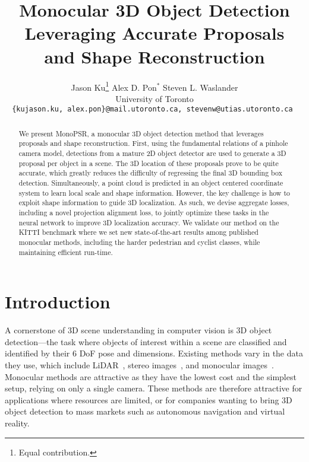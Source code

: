 \documentclass[10pt,twocolumn,letterpaper]{article}
\begin{document}
	
\title{Monocular 3D Object Detection Leveraging Accurate Proposals \\ and Shape Reconstruction}
	
	\author{Jason Ku\thanks{Equal contribution.} \quad Alex D. Pon$^\ast$ \quad Steven L. Waslander \\
	University of Toronto \\
	\tt\small\{kujason.ku, alex.pon\}@mail.utoronto.ca, stevenw@utias.utoronto.ca
	}
	
	\maketitle


\begin{abstract}
		We present MonoPSR, a monocular 3D object detection method that leverages proposals and shape reconstruction. First, using the fundamental relations of a pinhole camera model, detections from a mature 2D object detector are used to generate a 3D proposal per object in a scene. The 3D location of these proposals prove to be quite accurate, which greatly reduces the difficulty of regressing the final 3D bounding box detection. Simultaneously, a point cloud is predicted in an object centered coordinate system to learn local scale and shape  information. However, the key challenge is how to exploit shape information to guide 3D localization. As such, we devise aggregate losses, including a novel projection alignment loss, to jointly optimize these tasks in the neural network to improve 3D localization accuracy. We validate our method on the KITTI benchmark where we set new state-of-the-art results among published monocular methods, including the harder pedestrian and cyclist classes, while maintaining efficient run-time.
	\end{abstract}
	
\section{Introduction}
	
	A cornerstone of 3D scene understanding in computer vision is 3D object detection---the task where objects of interest within a scene are classified and identified by their 6 DoF pose and dimensions. Existing methods vary in the data they use, which include LiDAR~\cite{ku_avod, qi_fpointnet, yan2018second, pixor, zhou}, stereo images~\cite{chen_3dop}, and monocular images~\cite{chabot_deepmanta, lindernoren, kundu_3drcnn, mousavian_deep3dbox, xu_multifusion}. Monocular methods are attractive as they have the lowest cost and the simplest setup, relying on only a single camera. These methods are therefore attractive for applications where resources are limited, or for companies wanting to bring 3D object detection to mass markets such as autonomous navigation and virtual reality.
	
\end{document}
